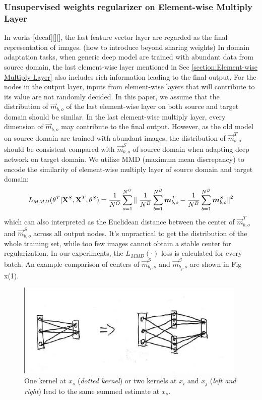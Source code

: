 \documentclass[runningheads]{llncs}
\begin{document}
\subsubsection{Unsupervised weights regularizer on Element-wise Multiply Layer}
In works [decaf][][], the last feature vector layer are regarded as the final representation of images. (how to introduce beyond sharing weights) In domain adaptation tasks, when generic deep model are trained with abundant data from source domain, the last element-wise layer mentioned in Sec \ref{section:Element-wise Multiply Layer} also includes rich information leading to the final output. For the nodes in the output layer, inputs from element-wise layers that will contribute to its value are not randomly decided. In this paper, we assume that the distribution of $\vec{m}_{b,o}$ of the last element-wise layer on both source and target domain should be similar. In the last element-wise multiply layer, every dimension of $\vec{m}_{b,o}$ may contribute to the final output. However, as the old model on source domain are trained with abundant images, the distribution of $\vec{m}^{T}_{b,o}$ should be consistent compared with $\vec{m}^{S}_{b,o}$ of source domain when adapting deep network on target domain. We utilize MMD (maximum mean discrepancy) to encode the similarity of element-wise multiply layer of source domain and target domain:
\begin{equation}\label{equation:LMMD}
  L_{MMD}(\theta^{T}|{\bf X}^{S},{\bf X}^{T},\theta^{S}) = \frac{1}{N^{O}} \sum^{N^{O}}_{o=1}{\parallel \frac{1}{N^{B}}\sum^{N^{B}}_{b=1}{\vec{m}^{T}_{b,o}} - \frac{1}{N^{B}}\sum^{N^{B}}_{b=1}{\vec{m}^{S}_{b,o}} {\parallel}^{2}  }
\end{equation}
which can also interpreted as the Euclidean distance between the center of $\vec{m}^{T}_{b,o}$ and $\vec{m}^{S}_{b,o}$ across all output nodes. It's unpractical to get the distribution of the whole training set, while too few images cannot obtain a stable center for regularization. In our experiments, the $L_{MMD}(\cdot)$ loss is calculated for every batch. An example comparison of centers of $\vec{m}^{S}_{b_{i},o}$ and $\vec{m}^{S}_{b_{j},o}$ are shown in Fig x(1).

\begin{figure}
\centering
\includegraphics[height=4.5cm]{images/fullconnectlayers.png}
\caption{One kernel at $x_s$ ({\it dotted kernel}) or two kernels at
$x_i$ and $x_j$ ({\it left and right}) lead to the same summed estimate
at $x_s$. }
\label{fig:example}
\end{figure}
\end{document}
